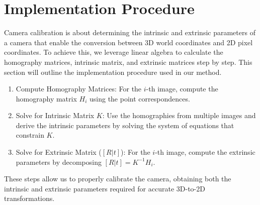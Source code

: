 \documentclass[12pt,letterpaper]{article}
\begin{document}
\section{Implementation Procedure}
Camera calibration is about determining the intrinsic and extrinsic parameters of a camera that enable the conversion between 3D world coordinates and 2D pixel coordinates. To achieve this, we leverage linear algebra to calculate the homography matrices, intrinsic matrix, and extrinsic matrices step by step. This section will outline the implementation procedure used in our method.
\begin{enumerate}
    \item Compute Homography Matrices: For the $i$-th image, compute the homography matrix $H_i$ using the point correspondences.
    \item Solve for Intrinsic Matrix $K$: Use the homographies from multiple images and derive the intrinsic parameters by solving the system of equations that constrain $K$.
    \item Solve for Extrinsic Matrix ($[R|t]$):
          For the $i$-th image, compute the extrinsic parameters by decomposing
          $[R|t] = K^{-1}H_i$.
\end{enumerate}

These steps allow us to properly calibrate the camera, obtaining both the intrinsic and extrinsic parameters required for accurate 3D-to-2D transformations.
\end{document}
